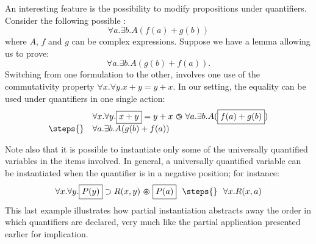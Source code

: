 An interesting feature is the possibility to modify propositions under
quantifiers. Consider the following possible :
$$\forall a.\exists b. A(f(a)+g(b))$$
where $A$, $f$ and $g$ can be complex expressions. Suppose we have a
lemma allowing us to prove:
$$\forall a.\exists b. A(g(b)+ f(a)).$$
Switching from one formulation to the other, involves one use of the
commutativity property $\forall x.\forall y. x+y=y+x$.
In our setting, the equality can be used under quantifiers in one single action:
$$
\begin{array}{ll}
  &\forall x.\forall y. \select{x+y}=y+x \back \forall a.\exists b. A(\select{f(a)+g(b)})\\
\steps{} & \forall a.\exists b. A(g(b)+f(a))
\end{array}$$


Note also that it is possible to instantiate only some of the universally
quantified variables in the items involved. In general, a universally
quantified variable can be instantiated when the quantifier is in a
negative position; for instance:
$$
\begin{array}{rcl}
 \forall x.\forall
 y. \select{P(y)}\limp R(x,y)\forw \select{P(a)} ~\/~\steps{}
~\/~ \forall x. R(x,a)
\end{array}
$$
This last example illustrates how partial instantiation abstracts away the order
in which quantifiers are declared, very much like the partial application
presented earlier for implication.


